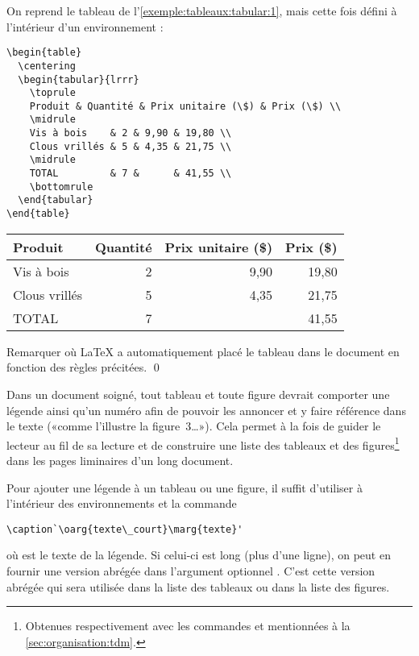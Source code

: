 \begin{exemple}
  On reprend le tableau de l'\autoref{exemple:tableaux:tabular:1}, mais cette
  fois défini à l'intérieur d'un environnement :
\begin{lstlisting}
\begin{table}
  \centering
  \begin{tabular}{lrrr}
    \toprule
    Produit & Quantité & Prix unitaire (\$) & Prix (\$) \\
    \midrule
    Vis à bois    & 2 & 9,90 & 19,80 \\
    Clous vrillés & 5 & 4,35 & 21,75 \\
    \midrule
    TOTAL         & 7 &      & 41,55 \\
    \bottomrule
  \end{tabular}
\end{table}
\end{lstlisting}
  \begin{table}
    \centering
    \begin{tabular}{lrrr}
      \toprule
      Produit & Quantité & Prix unitaire (\$) & Prix (\$) \\
      \midrule
      Vis à bois    & 2 & 9,90 & 19,80 \\
      Clous vrillés & 5 & 4,35 & 21,75 \\
      \midrule
      TOTAL         & 7 &      & 41,55 \\
      \bottomrule
    \end{tabular}
  \end{table}
  Remarquer où {\LaTeX} a automatiquement placé le tableau dans le
  document en fonction des règles précitées. %
  \qed
\end{exemple}

Dans un document soigné, tout tableau et toute figure devrait
comporter une légende ainsi qu'un numéro afin de pouvoir les
annoncer et y faire référence dans le texte («comme l'illustre la
figure~3\dots»). Cela
permet à la fois de guider le lecteur au fil de sa lecture et de
construire une liste des tableaux et des figures\footnote{%
  Obtenues respectivement avec les commandes \cmd{\listoftables} et
  \cmd{\listoffigures} mentionnées à la
  \autoref{sec:organisation:tdm}.} %
dans les pages liminaires d'un long document.

Pour ajouter une légende à un tableau ou une figure, il suffit
d'utiliser à l'intérieur des environnements  et 
la commande
\begin{lstlisting}
\caption`\oarg{texte\_court}\marg{texte}'
\end{lstlisting}
où  est le texte de la légende. Si celui-ci est long
(plus d'une ligne), on peut en fournir une version abrégée dans
l'argument optionnel . C'est cette version abrégée
qui sera utilisée dans la liste des tableaux ou dans la liste des
figures.

